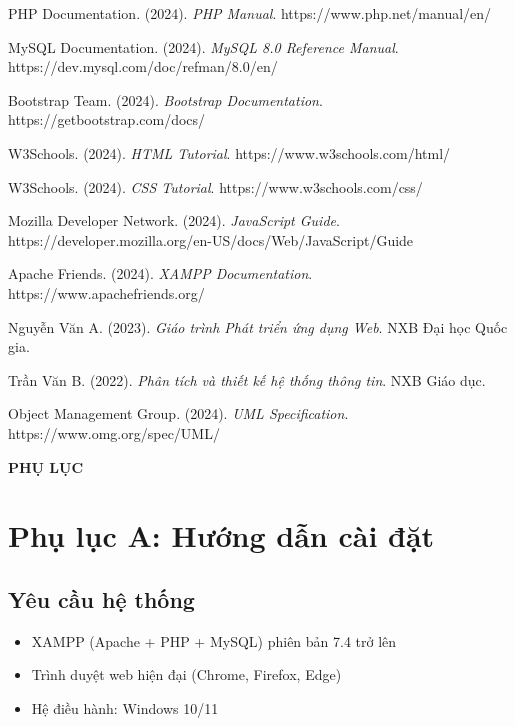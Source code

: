 \documentclass[a4paper,12pt]{report}
\begin{document}
\begin{enumerate}[label={[\arabic*]}]
    \item PHP Documentation. (2024). \textit{PHP Manual}. https://www.php.net/manual/en/
    
    \item MySQL Documentation. (2024). \textit{MySQL 8.0 Reference Manual}. https://dev.mysql.com/doc/refman/8.0/en/
    
    \item Bootstrap Team. (2024). \textit{Bootstrap Documentation}. https://getbootstrap.com/docs/
    
    \item W3Schools. (2024). \textit{HTML Tutorial}. https://www.w3schools.com/html/
    
    \item W3Schools. (2024). \textit{CSS Tutorial}. https://www.w3schools.com/css/
    
    \item Mozilla Developer Network. (2024). \textit{JavaScript Guide}. https://developer.mozilla.org/en-US/docs/Web/JavaScript/Guide
    
    \item Apache Friends. (2024). \textit{XAMPP Documentation}. https://www.apachefriends.org/
    
    \item Nguyễn Văn A. (2023). \textit{Giáo trình Phát triển ứng dụng Web}. NXB Đại học Quốc gia.
    
    \item Trần Văn B. (2022). \textit{Phân tích và thiết kế hệ thống thông tin}. NXB Giáo dục.
    
    \item Object Management Group. (2024). \textit{UML Specification}. https://www.omg.org/spec/UML/
\end{enumerate}

\newpage
{}
\begin{center}
\textbf{\Large PHỤ LỤC}
\end{center}
\vspace{1cm}

\section*{Phụ lục A: Hướng dẫn cài đặt}

\subsection*{Yêu cầu hệ thống}
\begin{itemize}
    \item XAMPP (Apache + PHP + MySQL) phiên bản 7.4 trở lên
    \item Trình duyệt web hiện đại (Chrome, Firefox, Edge)
    \item Hệ điều hành: Windows 10/11
\end{itemize}
\end{document}
